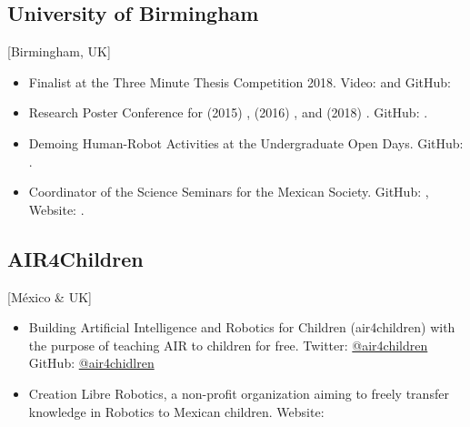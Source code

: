 \documentclass{mycv}
\begin{document}
\subsection{University of Birmingham}[Birmingham, UK]
\vspace{1mm}
\begin{positions}
\end{positions}
\begin{itemize}
\item  Finalist at the Three Minute Thesis Competition 2018. Video: \href{https://www.youtube.com/watch?v=07ewRYcS-0g}{\faYoutube} and 
GitHub: \href{https://github.com/mxochicale/3mt}{\faGithub*} 

\item Research Poster Conference for 
(2015) \href{https://github.com/mxochicale/PhD/blob/master/posters/Research_Poster_Conference_UoB/2015/poster/poster.pdf}{\faImage}, 
(2016) \href{https://github.com/mxochicale/PhD/blob/master/posters/Research_Poster_Conference_UoB/2016/poster/poster.pdf}{\faImage}, and  
(2018) \href{https://github.com/mxochicale/PhD/blob/master/posters/Research_Poster_Conference_UoB/2018/poster/main/map479-poster-uob2018.pdf}{\faImage}.
GitHub: \href{https://github.com/mxochicale/PhD/tree/master/posters/Research_Poster_Conference_UoB}{\faGithub*}.

\item Demoing Human-Robot Activities at the Undergraduate Open Days. GitHub: \href{https://github.com/mxochicale/opendayuob-hridemo}{\faGithub*}. 

\item Coordinator of the Science Seminars for the Mexican Society.  GitHub: \href{https://github.com/MexicanSocietyUoB}{\faGithub*}, Website: \href{https://mexicansocietyuob.github.io/seminars/}{\faExternalLink*}. 

\end{itemize}


\subsection{AIR4Children}[M\'exico \& UK]
\begin{itemize}

\item Building Artificial Intelligence and Robotics for Children (air4children) with the purpose of teaching AIR to children for free. 
Twitter: \href{https://twitter.com/air4children}{\faTwitter @air4children} 
GitHub: \href{https://github.com/air4children}{\faGithub* @air4chidlren} 

\item Creation Libre Robotics, a non-profit organization aiming to freely transfer knowledge in Robotics to Mexican children.  Website: \href{https://sites.google.com/site/LibreRobotics/}{\faExternalLink*}  

\end{itemize}
\end{document}

